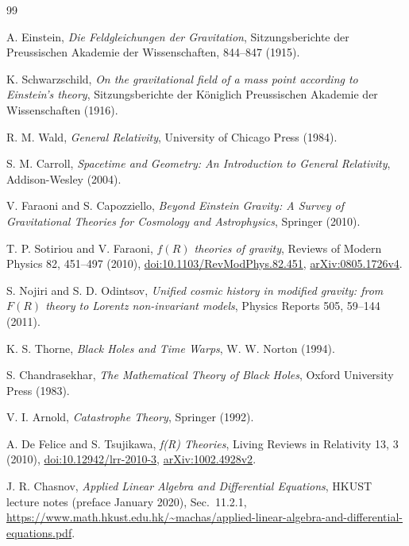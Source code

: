 \documentclass[11pt,a4paper]{article}
\begin{document}
\begin{thebibliography}{99}

A. Einstein,
\textit{Die Feldgleichungen der Gravitation},
Sitzungsberichte der Preussischen Akademie der Wissenschaften, 844--847 (1915).

K. Schwarzschild,
\textit{On the gravitational field of a mass point according to Einstein's theory},
Sitzungsberichte der K\"oniglich Preussischen Akademie der Wissenschaften (1916).

R. M. Wald,
\textit{General Relativity},
University of Chicago Press (1984).

S. M. Carroll,
\textit{Spacetime and Geometry: An Introduction to General Relativity},
Addison-Wesley (2004).

V. Faraoni and S. Capozziello,
\textit{Beyond Einstein Gravity: A Survey of Gravitational Theories for Cosmology and Astrophysics},
Springer (2010).

T. P. Sotiriou and V. Faraoni,
\textit{\(f(R)\) theories of gravity},
Reviews of Modern Physics 82, 451--497 (2010),
\href{https://doi.org/10.1103/RevModPhys.82.451}{doi:10.1103/RevModPhys.82.451},
\href{https://arxiv.org/abs/0805.1726v4}{arXiv:0805.1726v4}.

S. Nojiri and S. D. Odintsov,
\textit{Unified cosmic history in modified gravity: from \(F(R)\) theory to Lorentz non-invariant models},
Physics Reports 505, 59--144 (2011).

K. S. Thorne,
\textit{Black Holes and Time Warps},
W. W. Norton (1994).

S. Chandrasekhar,
\textit{The Mathematical Theory of Black Holes},
Oxford University Press (1983).

V. I. Arnold,
\textit{Catastrophe Theory},
Springer (1992).

A. De Felice and S. Tsujikawa,
\textit{f(R) Theories},
Living Reviews in Relativity 13, 3 (2010),
\href{https://doi.org/10.12942/lrr-2010-3}{doi:10.12942/lrr-2010-3},
\href{https://arxiv.org/abs/1002.4928v2}{arXiv:1002.4928v2}.

J. R. Chasnov,
\textit{Applied Linear Algebra and Differential Equations},
HKUST lecture notes (preface January 2020), Sec.~11.2.1,
\url{https://www.math.hkust.edu.hk/~machas/applied-linear-algebra-and-differential-equations.pdf}.



\end{thebibliography}
\end{document}
